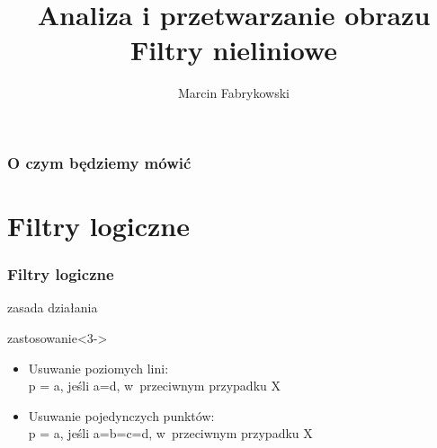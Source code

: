 \documentclass{beamer}
\author{Marcin Fabrykowski}
\title{Analiza i przetwarzanie obrazu\\Filtry nieliniowe}
\begin{document}
\begin{frame}
\maketitle
\end{frame}
\begin{frame}
\frametitle{O czym będziemy mówić}
\tableofcontents
\end{frame}
\section{Filtry logiczne}
\begin{frame}
\frametitle{Filtry logiczne}
\begin{block}{zasada działania}
\only<2->{
	\begin{tabular}{|c|c|c|}
	\hline
	&a&\\
	\hline
	b&X&c\\
	\hline
	&d&\\
	\hline
	\end{tabular}
	}
\end{block}
\begin{block}{zastosowanie}<3->
\begin{itemize}
\item Usuwanie poziomych lini:\\p = a, jeśli a=d, w~przeciwnym przypadku X
\item Usuwanie pojedynczych punktów:\\p = a, jeśli a=b=c=d, w~przeciwnym przypadku X
\end{itemize}
\end{block}
\end{frame}
\end{document}
